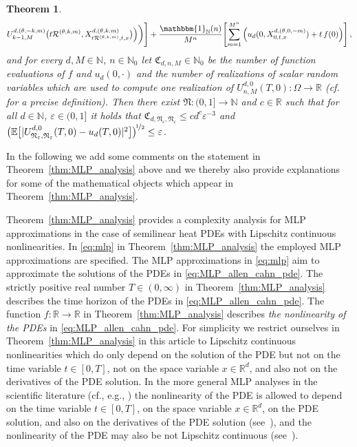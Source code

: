 \documentclass[12pt]{article}
\newtheorem{theorem}{Theorem}
\theoremstyle{definition}
\newcommand{\R}{\mathbb{R}}
\newcommand{\E}{\mathbb{E}}
\newcommand{\N}{\mathbb{N}}
\begin{document}
\begin{theorem}
\begin{align}
  U^{d,(\theta,-k,m)}_{k-1,M}\big( t \mathcal{R}^{(\theta,k,m)} , 
  X^{d,(\theta,k,m)}_{ t \mathcal{R}^{(\theta,k,m)},t,x}\big)
  \Big)
  \bigg)
  \Bigg]
  + 
  \frac{ \mathbbm{1}_{ \N }( n ) }{M^n}\!\left[ 
  \sum_{m=1}^{M^n} 
  \left( 
  u_d(0,X^{d,(\theta,0,-m)}_{0,t,x}) 
  + 
  t \, f(0)
  \right)
  \right], 
  \nonumber
  \end{align} 
and for every 
$ d, M \in \N $, 
$ n \in \N_0 $
let 
$ \mathfrak{C}_{ d, n, M } \in \N_0 $
be the number of function evaluations of $ f $ and $ u_d(0,\cdot) $ and 
the number of realizations of scalar random variables 
which are used to compute one realization of 
$ U^{d,0}_{n,M}(T,0) \colon \Omega \to \R $ 
(cf.~\cite[Corollary 4.4]{hutzenthaler2020lipschitz} for a precise definition). 
Then there exist
$ \mathfrak{N} \colon (0,1] \to \N $ 
and 
$ c \in \R $ 
such that for all 
$ d \in \N $, $ \varepsilon \in (0,1] $ 
it holds that 
$
  \mathfrak{C}_{d,\mathfrak{N}_{\varepsilon},\mathfrak{N}_{\varepsilon}} 
  \leq c d^c \varepsilon^{ - 3 }
$
and 
$ 
  \big(  
    \E\big[ 
      |
        U^{d,0}_{\mathfrak{N}_{\varepsilon},\mathfrak{N}_{\varepsilon}}(T,0)
        - 
        u_d(T,0)
      |^2
    \big]
  \big)^{\!\nicefrac12} 
  \leq \varepsilon
$. 
\end{theorem} 
%
%
%
%
%
%
In the following we add some comments on the statement in Theorem~\ref{thm:MLP_analysis} above 
and we thereby also provide explanations for some of the mathematical objects which appear in Theorem~\ref{thm:MLP_analysis}. 


Theorem~\ref{thm:MLP_analysis} provides a complexity analysis for MLP approximations 
in the case of semilinear heat PDEs with Lipschitz continuous nonlinearities. 
In \eqref{eq:mlp} in Theorem~\ref{thm:MLP_analysis} the employed MLP approximations are specified. 
The MLP approximations in \eqref{eq:mlp} aim to approximate the solutions of the PDEs in \eqref{eq:MLP_allen_cahn_pde}. 
%
%
The strictly positive real number $ T \in (0,\infty) $ in Theorem~\ref{thm:MLP_analysis} describes the time horizon of the PDEs in \eqref{eq:MLP_allen_cahn_pde}. The function $ f \colon \R \to \R $ in Theorem~\ref{thm:MLP_analysis} describes \emph{the nonlinearity of the PDEs} in \eqref{eq:MLP_allen_cahn_pde}. For simplicity we restrict ourselves in 
Theorem~\ref{thm:MLP_analysis} in this article to Lipschitz continuous 
nonlinearities which do only depend on the solution of the PDE but not 
on the time variable $ t \in [0,T] $, not on the space variable $ x \in \R^d $, and also not on the derivatives 
of the PDE solution. In the more general MLP analyses in the scientific literature 
(cf., 
e.g., \cite{
Hutzenthaleretal2018arXiv,
hutzenthaler2019arxiv1903,
Becketal2019MLP_nonlip_arXiv,
giles2019generalised,
beck2020arxiv2003,
becker2020arxiv2005,
hutzenthaler2019arxiv1912,
hutzenthaler2020lipschitz}) the nonlinearity of the PDE is allowed to depend on the time variable $ t \in [0,T] $, 
on the space variable $ x \in \R^d $, 
on the PDE solution, 
and also on the derivatives of the PDE solution (see~\cite{hutzenthaler2019arxiv1912}), 
and the nonlinearity of the PDE may also be not Lipschitz continuous (see~\cite{Becketal2019MLP_nonlip_arXiv,becker2020arxiv2005}). 
\end{document}
